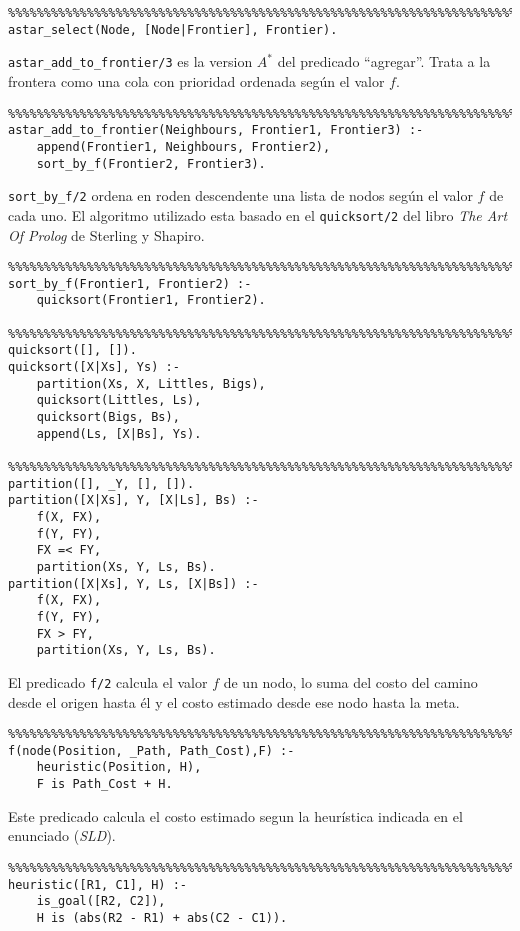 \documentclass[a4paper,12pt]{report}
\begin{document}
\begin{verbatim}
%%%%%%%%%%%%%%%%%%%%%%%%%%%%%%%%%%%%%%%%%%%%%%%%%%%%%%%%%%%%%%%%%%%%%%%%%%%%%%%
astar_select(Node, [Node|Frontier], Frontier).

\end{verbatim}

\texttt{astar\_add\_to\_frontier/3} es la version $A^{*}$ del predicado ``agregar''.
Trata a la frontera como una cola con prioridad ordenada seg\'{u}n el valor $f$.

\begin{verbatim}
%%%%%%%%%%%%%%%%%%%%%%%%%%%%%%%%%%%%%%%%%%%%%%%%%%%%%%%%%%%%%%%%%%%%%%%%%%%%%%%
astar_add_to_frontier(Neighbours, Frontier1, Frontier3) :-
    append(Frontier1, Neighbours, Frontier2),
    sort_by_f(Frontier2, Frontier3).

\end{verbatim}

\texttt{sort\_by\_f/2} ordena en roden descendente una lista de nodos seg\'{u}n el valor $f$ de cada uno.
El algoritmo utilizado esta basado en el \texttt{quicksort/2} del libro \textit{The Art Of Prolog} de Sterling y Shapiro.

\begin{verbatim}
%%%%%%%%%%%%%%%%%%%%%%%%%%%%%%%%%%%%%%%%%%%%%%%%%%%%%%%%%%%%%%%%%%%%%%%%%%%%%%%
sort_by_f(Frontier1, Frontier2) :-
    quicksort(Frontier1, Frontier2).

%%%%%%%%%%%%%%%%%%%%%%%%%%%%%%%%%%%%%%%%%%%%%%%%%%%%%%%%%%%%%%%%%%%%%%%%%%%%%%%
quicksort([], []).
quicksort([X|Xs], Ys) :-
    partition(Xs, X, Littles, Bigs),
    quicksort(Littles, Ls),
    quicksort(Bigs, Bs),
    append(Ls, [X|Bs], Ys).

%%%%%%%%%%%%%%%%%%%%%%%%%%%%%%%%%%%%%%%%%%%%%%%%%%%%%%%%%%%%%%%%%%%%%%%%%%%%%%%
partition([], _Y, [], []).
partition([X|Xs], Y, [X|Ls], Bs) :-
    f(X, FX),
    f(Y, FY),
    FX =< FY,
    partition(Xs, Y, Ls, Bs).
partition([X|Xs], Y, Ls, [X|Bs]) :-
    f(X, FX),
    f(Y, FY),
    FX > FY,
    partition(Xs, Y, Ls, Bs).

\end{verbatim}

El predicado \texttt{f/2} calcula el valor $f$ de un nodo, lo suma del costo del camino desde el origen hasta \'{e}l y
el costo estimado desde ese nodo hasta la meta.

\begin{verbatim}
%%%%%%%%%%%%%%%%%%%%%%%%%%%%%%%%%%%%%%%%%%%%%%%%%%%%%%%%%%%%%%%%%%%%%%%%%%%%%%%
f(node(Position, _Path, Path_Cost),F) :-
    heuristic(Position, H),
    F is Path_Cost + H.

\end{verbatim}

Este predicado calcula el costo estimado segun la heur\'{i}stica indicada en el enunciado (\textit{SLD}).

\begin{verbatim}
%%%%%%%%%%%%%%%%%%%%%%%%%%%%%%%%%%%%%%%%%%%%%%%%%%%%%%%%%%%%%%%%%%%%%%%%%%%%%%%
heuristic([R1, C1], H) :-
    is_goal([R2, C2]),
    H is (abs(R2 - R1) + abs(C2 - C1)).

\end{verbatim}
\end{document}
